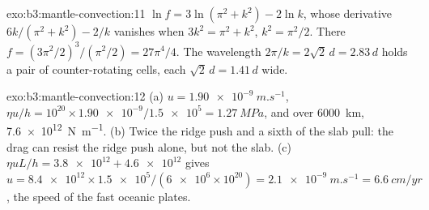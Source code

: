 \begin{solution}{exo:b3:mantle-convection:11}
$\ln f = 3\ln(\pi^2 + k^2) - 2\ln k$, whose derivative $6k/(\pi^2 + k^2) - 2/k$
vanishes when $3k^2 = \pi^2 + k^2$, $k^2 = \pi^2/2$. There $f = (3\pi^2/2)^3/
(\pi^2/2) = 27\pi^4/4$. The wavelength $2\pi/k = 2\sqrt2\,d = 2.83\,d$ holds a
pair of counter-rotating cells, each $\sqrt2\,d = 1.41\,d$ wide.
\end{solution}

\begin{solution}{exo:b3:mantle-convection:12}
(a) $u = \qty{1.90e-9}{m.s^{-1}}$, $\eta u/h = 10^{20}\times\num{1.90e-9}/
\num{1.5e5} = \qty{1.27}{MPa}$, and over \qty{6000}{km}, \qty{7.6e12}{N.m^{-1}}.
(b) Twice the ridge push and a sixth of the slab pull: the drag can resist
the ridge push alone, but not the slab. (c) $\eta uL/h = \num{3.8e12} +
\num{4.6e12}$ gives $u = \num{8.4e12}\times\num{1.5e5}/(\num{6e6}\times10^{20})
= \qty{2.1e-9}{m.s^{-1}} = \qty{6.6}{cm/yr}$, the speed of the fast oceanic
plates.
\end{solution}


